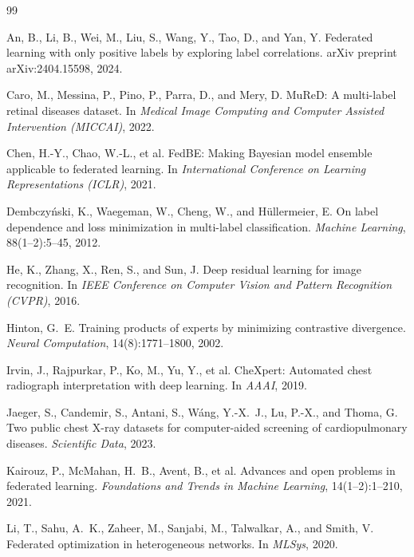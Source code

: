 \documentclass[11pt,a4paper]{article}
\theoremstyle{definition}
\begin{document}
\begin{thebibliography}{99}
\setlength{\itemsep}{2pt}

An, B., Li, B., Wei, M., Liu, S., Wang, Y., Tao, D., and Yan, Y.
\newblock Federated learning with only positive labels by exploring label correlations.
\newblock arXiv preprint arXiv:2404.15598, 2024.

Caro, M., Messina, P., Pino, P., Parra, D., and Mery, D.
\newblock MuReD: A multi-label retinal diseases dataset.
\newblock In \emph{Medical Image Computing and Computer Assisted Intervention (MICCAI)}, 2022.

Chen, H.-Y., Chao, W.-L., et al.
\newblock FedBE: Making Bayesian model ensemble applicable to federated learning.
\newblock In \emph{International Conference on Learning Representations (ICLR)}, 2021.

Dembczy\'nski, K., Waegeman, W., Cheng, W., and H\"ullermeier, E.
\newblock On label dependence and loss minimization in multi-label classification.
\newblock \emph{Machine Learning}, 88(1--2):5--45, 2012.

He, K., Zhang, X., Ren, S., and Sun, J.
\newblock Deep residual learning for image recognition.
\newblock In \emph{IEEE Conference on Computer Vision and Pattern Recognition (CVPR)}, 2016.

Hinton, G.~E.
\newblock Training products of experts by minimizing contrastive divergence.
\newblock \emph{Neural Computation}, 14(8):1771--1800, 2002.

Irvin, J., Rajpurkar, P., Ko, M., Yu, Y., et al.
\newblock CheXpert: Automated chest radiograph interpretation with deep learning.
\newblock In \emph{AAAI}, 2019.

Jaeger, S., Candemir, S., Antani, S., W\'ang, Y.-X.~J., Lu, P.-X., and Thoma, G.
\newblock Two public chest X-ray datasets for computer-aided screening of cardiopulmonary diseases.
\newblock \emph{Scientific Data}, 2023.

Kairouz, P., McMahan, H.~B., Avent, B., et al.
\newblock Advances and open problems in federated learning.
\newblock \emph{Foundations and Trends in Machine Learning}, 14(1--2):1--210, 2021.

Li, T., Sahu, A.~K., Zaheer, M., Sanjabi, M., Talwalkar, A., and Smith, V.
\newblock Federated optimization in heterogeneous networks.
\newblock In \emph{MLSys}, 2020.


\end{thebibliography}
\end{document}
